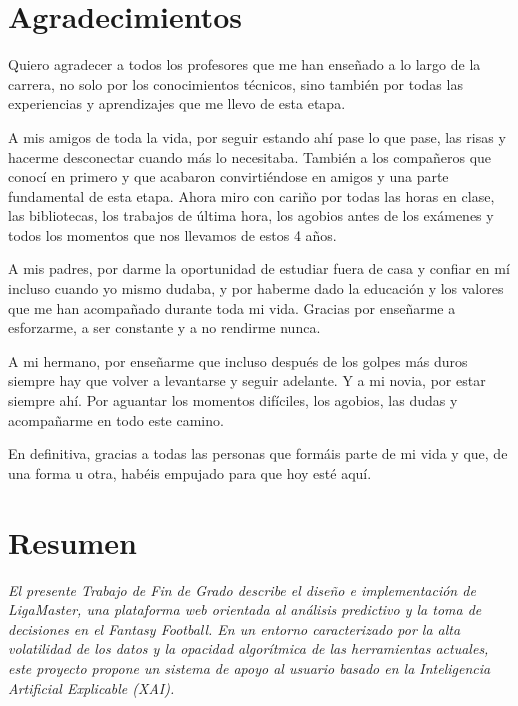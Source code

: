 \documentclass[12pt]{article}
\begin{document}
\clearpage\setcounter{page}{1} %

\section*{Agradecimientos}
Quiero agradecer a todos los profesores que me han enseñado a lo largo de la carrera, 
no solo por los conocimientos técnicos, sino también por todas las experiencias y aprendizajes que me llevo de esta etapa.

A mis amigos de toda la vida, por seguir estando ahí pase lo que pase, las risas y hacerme desconectar cuando más lo necesitaba. También a los compañeros que conocí en primero y que acabaron convirtiéndose en amigos y una parte fundamental de esta etapa.
 Ahora miro con cariño por todas las horas en clase, las bibliotecas, los trabajos de última hora, los agobios antes de los exámenes
  y todos los momentos que nos llevamos de estos 4 años.

A mis padres, por darme la oportunidad de estudiar fuera de casa y confiar en mí incluso cuando yo mismo dudaba,
y por haberme dado la educación y los valores que me han acompañado durante toda mi vida. Gracias por enseñarme a esforzarme, 
a ser constante y a no rendirme nunca.

A mi hermano, por enseñarme que incluso después de los golpes más duros siempre hay que volver a levantarse y seguir adelante. 
Y a mi novia, por estar siempre ahí. Por aguantar los momentos difíciles, los agobios, las dudas y acompañarme en todo
este camino.

En definitiva, gracias a todas las personas que formáis parte de mi vida y que, de una forma u otra, habéis empujado para que hoy esté aquí.

\clearpage
\section*{Resumen}
\textit{El presente Trabajo de Fin de Grado describe el diseño e implementación de LigaMaster, una plataforma web orientada al análisis predictivo y la toma de decisiones en el Fantasy Football. En un entorno caracterizado por la alta volatilidad de los datos y la opacidad algorítmica de las herramientas actuales, este proyecto propone un sistema de apoyo al usuario basado en la Inteligencia Artificial Explicable (XAI).}
\end{document}
